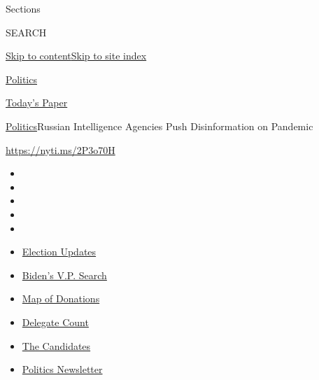 Sections

SEARCH

\protect\hyperlink{site-content}{Skip to
content}\protect\hyperlink{site-index}{Skip to site index}

\href{https://www.nytimes.com/section/politics}{Politics}

\href{https://myaccount.nytimes.com/auth/login?response_type=cookie\&client_id=vi}{}

\href{https://www.nytimes.com/section/todayspaper}{Today's Paper}

\href{/section/politics}{Politics}\textbar{}Russian Intelligence
Agencies Push Disinformation on Pandemic

\url{https://nyti.ms/2P3o70H}

\begin{itemize}
\item
\item
\item
\item
\item
\end{itemize}

\begin{itemize}
\item
  \href{https://www.nytimes.com/2020/07/31/us/elections/biden-vs-trump.html?action=click\&pgtype=Article\&state=default\&region=TOP_BANNER\&context=storylines_menu}{Election
  Updates}
\item
  \href{https://www.nytimes.com/article/biden-vice-president-2020.html?action=click\&pgtype=Article\&state=default\&region=TOP_BANNER\&context=storylines_menu}{Biden's
  V.P. Search}
\item
  \href{https://www.nytimes.com/interactive/2020/07/24/us/politics/trump-biden-campaign-donors.html?action=click\&pgtype=Article\&state=default\&region=TOP_BANNER\&context=storylines_menu}{Map
  of Donations}
\item
  \href{https://www.nytimes.com/interactive/2020/us/elections/delegate-count-primary-results.html?action=click\&pgtype=Article\&state=default\&region=TOP_BANNER\&context=storylines_menu}{Delegate
  Count}
\item
  \href{https://www.nytimes.com/interactive/2019/us/politics/2020-presidential-candidates.html?action=click\&pgtype=Article\&state=default\&region=TOP_BANNER\&context=storylines_menu}{The
  Candidates}
\item
  \href{https://www.nytimes.com/newsletters/politics?action=click\&pgtype=Article\&state=default\&region=TOP_BANNER\&context=storylines_menu}{Politics
  Newsletter}
\end{itemize}

